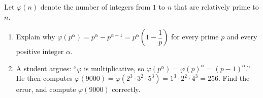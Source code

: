 Let $\varphi(n)$ denote the number of integers from $1$ to $n$ that are relatively prime to $n$.
\begin{enumerate}
\item[(a)] Explain why $\varphi\left(p^\alpha\right)=p^\alpha-p^{\alpha-1}=p^\alpha\left(1-\dfrac{1}{p}\right)$ for every prime $p$ and every positive integer $\alpha$.
\item[(b)] A student argues: ``$\varphi$ is multiplicative, so $\varphi\left(p^\alpha\right)=\varphi(p)^\alpha=(p-1)^\alpha$.'' He then computes $\varphi(9000)=\varphi\left(2^3\cdot3^2\cdot5^3\right)=1^3\cdot2^2\cdot4^3=256$. Find the error, and compute $\varphi(9000)$ correctly.
\end{enumerate}

